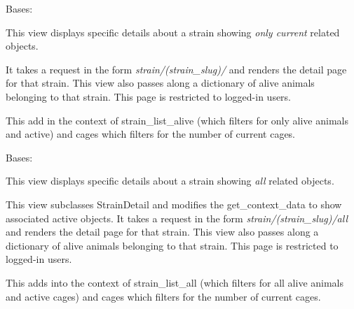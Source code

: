 \documentclass[letterpaper,10pt,english]{sphinxmanual}
\begin{document}
\begin{fulllineitems}
\label{api:mousedb.animal.views.StrainDetail}
Bases: {\hyperref[api:mousedb.views.ProtectedDetailView]{}}

This view displays specific details about a strain showing \emph{only current} related objects.

It takes a request in the form \emph{strain/(strain\_slug)/} and renders the detail page for that strain.
This view also passes along a dictionary of alive animals belonging to that strain.
This page is restricted to logged-in users.


\begin{fulllineitems}
\label{api:mousedb.animal.views.StrainDetail.get_context_data}
This add in the context of strain\_list\_alive (which filters for only alive animals and active) and cages which filters for the number of current cages.

\end{fulllineitems}


\end{fulllineitems}



\begin{fulllineitems}
\label{api:mousedb.animal.views.StrainDetailAll}
Bases: {\hyperref[api:mousedb.animal.views.StrainDetail]{}}

This view displays specific details about a strain showing \emph{all} related objects.

This view subclasses StrainDetail and modifies the get\_context\_data to show associated active objects.
It takes a request in the form \emph{strain/(strain\_slug)/all} and renders the detail page for that strain.
This view also passes along a dictionary of alive animals belonging to that strain.
This page is restricted to logged-in users.


\begin{fulllineitems}
\label{api:mousedb.animal.views.StrainDetailAll.get_context_data}
This adds into the context of strain\_list\_all (which filters for all alive animals and active cages) and cages which filters for the number of current cages.

\end{fulllineitems}


\end{fulllineitems}
\end{document}
